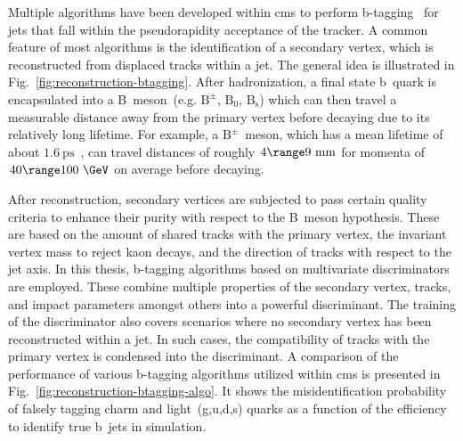 Multiple algorithms have been developed within \gls{cms} to perform b-tagging~\cite{Chatrchyan:2012jua,CMS-PAS-BTV-15-001} for jets that fall within the pseudorapidity acceptance of the tracker. A common feature of most algorithms is the identification of a secondary vertex, which is reconstructed from displaced tracks within a jet. The general idea is illustrated in Fig.~\ref{fig:reconstruction-btagging}. After hadronization, a final state b~quark is encapsulated into a B~meson~(e.g. $\mathrm{B}^{\pm}$, $\mathrm{B}_{0}$, $\mathrm{B}_\mathrm{s}$) which can then travel a measurable distance away from the primary vertex before decaying due to its relatively long lifetime. For example, a $\mathrm{B}^{\pm}$~meson, which has a mean lifetime of about $1.6~\mathrm{ps}$~\cite{Olive:2016xmw}, can travel distances of roughly $4\range9~\mathrm{mm}$ for momenta of $40\range100~\GeV$ on average before decaying.


After reconstruction, secondary vertices are subjected to pass certain quality criteria to enhance their purity with respect to the B~meson hypothesis. These are based on the amount of shared tracks with the primary vertex, the invariant vertex mass to reject kaon decays, and the direction of tracks with respect to the jet axis. In this thesis, b-tagging algorithms based on multivariate discriminators are employed. These combine multiple properties of the secondary vertex, tracks, and impact parameters amongst others into a powerful discriminant. The training of the discriminator also covers scenarios where no secondary vertex has been reconstructed within a jet. In such cases, the compatibility of tracks with the primary vertex is condensed into the discriminant. A comparison of the performance of various b-tagging algorithms utilized within \gls{cms} is presented in Fig.~\ref{fig:reconstruction-btagging-algo}. It shows the misidentification probability of falsely tagging charm and light~(g,u,d,s) quarks as a function of the efficiency to identify true b~jets in simulation.


